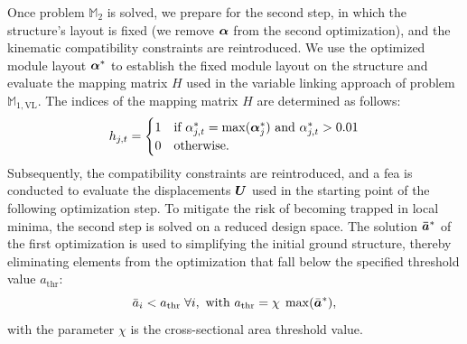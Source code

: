 Once problem $\mathbb{M}_2$ is solved, we prepare for the second step, in which the structure's layout is fixed (we remove $\bm{\alpha}$ from the second optimization), and the kinematic compatibility constraints are reintroduced. We use the optimized module layout $\bm{\alpha}^*$ to establish the fixed module layout on the structure and evaluate the mapping matrix $H$ used in the variable linking approach of problem $\mathbb{M}_{1,\text{VL}}$. The indices of the mapping matrix $H$ are determined as follows:
\begin{equation}
    h_{j,t} =
    \begin{cases}
      1 & \text{if $\alpha^*_{j,t} = \max(\bm{\alpha}^*_{j})$ and $\alpha^*_{j,t}>0.01$} \\
      0 & \text{otherwise.} 
    \end{cases}
\end{equation}
Subsequently, the compatibility constraints are reintroduced, and a \gls{fea} is conducted to evaluate the displacements $\bm{U}$ used in the starting point of the following optimization step. To mitigate the risk of becoming trapped in local minima, the second step is solved on a reduced design space. The solution $\bm{\bar{a}}^*$ of the first optimization is used to simplifying the initial ground structure, thereby eliminating elements from the optimization that fall below the specified threshold value $a_{\text{thr}}$:
\begin{equation}
    \bar{a}_i<a_{\text{thr}} \; \forall i, \text{ with }a_{\text{thr}} = \chi \; \max(\bar{\bm{a}}^*),
    \label{eq:06_thr}
\end{equation}
with the parameter $\chi$ is the cross-sectional area threshold value.

